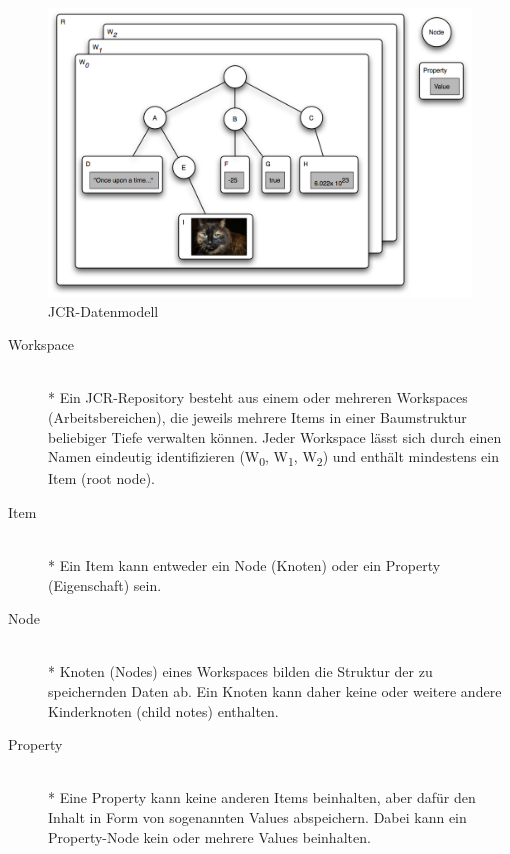 \begin{figure}[!h]
\begin{center}
\includegraphics[scale=0.3]{images/repository/repository_diagramm.png}
\caption{JCR-Datenmodell}
\label{jcrdatenmodell}
\end{center}
\end{figure}



\begin{description}
\item[Workspace]\mbox{~}\\*
Ein JCR-Repository besteht aus einem oder mehreren Workspaces (Arbeitsbereichen), die jeweils mehrere Items in einer Baumstruktur beliebiger Tiefe verwalten können. Jeder Workspace lässt sich durch einen Namen eindeutig identifizieren (W\textsubscript{0}, W\textsubscript{1}, W\textsubscript{2}) und enthält mindestens ein Item (root node).
\item[Item]\mbox{~}\\*
Ein Item kann entweder ein Node (Knoten) oder ein Property (Eigenschaft) sein.
\item[Node]\mbox{~}\\*
Knoten (Nodes) eines Workspaces bilden die Struktur der zu speichernden Daten ab.
Ein Knoten kann daher keine oder weitere andere Kinderknoten (child notes) enthalten.
\item[Property]\mbox{~}\\*
Eine Property kann keine anderen Items beinhalten, aber dafür den Inhalt in Form von sogenannten Values abspeichern. Dabei kann ein Property-Node kein oder mehrere Values beinhalten.
\end{description}




